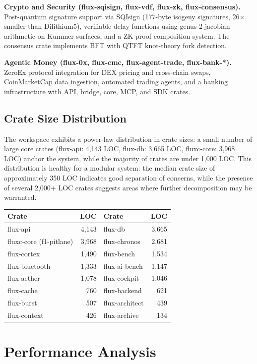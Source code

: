 \documentclass[11pt,a4paper]{article}
\begin{document}
\textbf{Crypto and Security (flux-sqisign, flux-vdf, flux-zk, flux-consensus).} Post-quantum signature support via SQIsign (177-byte isogeny signatures, 26$\times$ smaller than Dilithium5), verifiable delay functions using genus-2 jacobian arithmetic on Kummer surfaces, and a ZK proof composition system. The consensus crate implements BFT with QTFT knot-theory fork detection.

\textbf{Agentic Money (flux-0x, flux-cmc, flux-agent-trade, flux-bank-*).} ZeroEx protocol integration for DEX pricing and cross-chain swaps, CoinMarketCap data ingestion, automated trading agents, and a banking infrastructure with API, bridge, core, MCP, and SDK crates.

\subsection{Crate Size Distribution}

The workspace exhibits a power-law distribution in crate sizes: a small number of large core crates (flux-api: 4,143 LOC, flux-db: 3,665 LOC, fluxc-core: 3,968 LOC) anchor the system, while the majority of crates are under 1,000 LOC. This distribution is healthy for a modular system: the median crate size of approximately 350 LOC indicates good separation of concerns, while the presence of several 2,000+ LOC crates suggests areas where further decomposition may be warranted.

\begin{center}
\begin{tabular}{lrlr}
\toprule
\textbf{Crate} & \textbf{LOC} & \textbf{Crate} & \textbf{LOC} \\
\midrule
flux-api & 4,143 & flux-db & 3,665 \\
fluxc-core (f1-pitlane) & 3,968 & flux-chronos & 2,681 \\
flux-cortex & 1,490 & flux-bench & 1,534 \\
flux-bluetooth & 1,333 & flux-ai-bench & 1,147 \\
flux-aether & 1,078 & flux-cockpit & 1,046 \\
flux-cache & 760 & flux-backend & 621 \\
flux-burst & 507 & flux-architect & 439 \\
flux-context & 426 & flux-archive & 134 \\
\bottomrule
\end{tabular}
\end{center}

\section{Performance Analysis}
\end{document}
